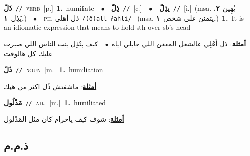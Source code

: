 \documentclass[10pt,a4paper,twoside]{article} %
\begin{document}
\begin{multicols}{2}
{\setlength\topsep{0pt}\textbf{\foreignlanguage{arabic}{ذَلّ}}\ {\color{gray}\texttt{//}\color{black}}\ \textsc{verb}\ [p.]\ \textbf{1.}~humiliate\ \ $\bullet$\ \ \setlength\topsep{0pt}\textbf{\foreignlanguage{arabic}{ذِلّ}}\ {\color{gray}\texttt{//}\color{black}}\ [c.]\ \ $\bullet$\ \ \setlength\topsep{0pt}\textbf{\foreignlanguage{arabic}{يذِلّ}}\ {\color{gray}\texttt{//}\color{black}}\ [i.]\ \color{gray}(msa. \foreignlanguage{arabic}{يُهِين}~\foreignlanguage{arabic}{\textbf{٢.}}  \foreignlanguage{arabic}{يَذِل}~\foreignlanguage{arabic}{\textbf{١.}})\color{black}\ \ $\bullet$\ \ \textsc{ph.} \color{gray} \foreignlanguage{arabic}{ذل أهلي}\color{black}\ {\color{gray}\texttt{/{\sffamily (ð)all ʔahli}/}\color{black}}\ \color{gray} (msa. \foreignlanguage{arabic}{يتمنن على شخص}~\foreignlanguage{arabic}{\textbf{١.}})\color{black}\ \textbf{1.}~It is an idiomatic expression that means to hold sth over sb's head\  \begin{flushright}\color{gray}\foreignlanguage{arabic}{\textbf{\underline{\foreignlanguage{arabic}{أمثلة}}}: ذَل أَهْلِي عالشغل المعفن اللي جابلي اياه\ $\bullet$\ \  كيف بِتْذِل بنت الناس اللي صبرت عليك كل هالوقت}\end{flushright}\color{black}} \vspace{2mm}

{\setlength\topsep{0pt}\textbf{\foreignlanguage{arabic}{ذُلّ}}\ {\color{gray}\texttt{//}\color{black}}\ \textsc{noun}\ [m.]\ \textbf{1.}~humiliation\  \begin{flushright}\color{gray}\foreignlanguage{arabic}{\textbf{\underline{\foreignlanguage{arabic}{أمثلة}}}: ماشفتش ذُل اكثر من هيك}\end{flushright}\color{black}} \vspace{2mm}

{\setlength\topsep{0pt}\textbf{\foreignlanguage{arabic}{مَذْلُول}}\ {\color{gray}\texttt{//}\color{black}}\ \textsc{adj}\ [m.]\ \textbf{1.}~humiliated\  \begin{flushright}\color{gray}\foreignlanguage{arabic}{\textbf{\underline{\foreignlanguage{arabic}{أمثلة}}}: شوف كيف ياحرام كان مثل المَذْلول}\end{flushright}\color{black}} \vspace{2mm}

\vspace{-3mm}
\subsection*{\color{blue}\foreignlanguage{arabic}{ذ.م.م}\color{blue}{}} 


\end{multicols}
\end{document}
